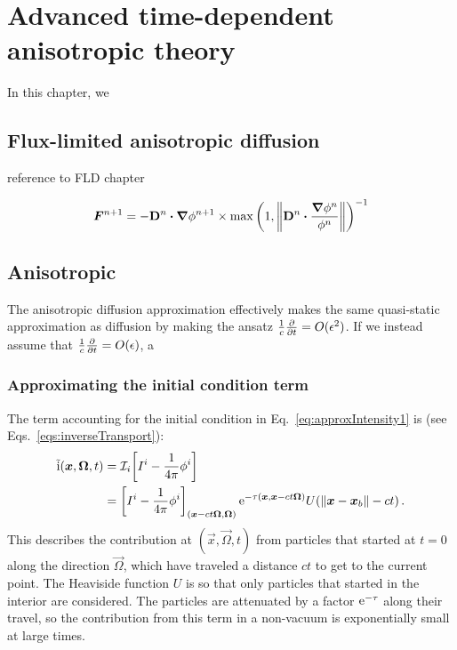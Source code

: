 
\chapter{Advanced time-dependent anisotropic theory}\label{chap:aponeDerivation}

In this chapter, we 

\section{Flux-limited anisotropic diffusion}


reference to FLD chapter

\begin{equation*}
  \bm{F}^{n+1} = -\mathbf{D}^{n}\bm{\cdot} \bm{\nabla} \phi^{n+1} \times 
  \max\left( 1, \left\| \mathbf{D}^{n}\bm{\cdot} \frac{\bm{\nabla} \phi^{n}}{\phi^{n}} \right\|
  \right)^{-1}
\end{equation*}


\section{Anisotropic \Pone}
The anisotropic diffusion approximation effectively makes the same quasi-static
approximation as diffusion by making the ansatz
$\frac1c\frac{\partial }{\partial t}=O(\epsilon^2)$. If we instead assume that
$\frac1c\frac{\partial }{\partial t}=O(\epsilon)$, a 

\subsection{Approximating the initial condition term}\label{sec:derPoneIc}
The term accounting for the initial condition in
Eq.~\eqref{eq:approxIntensity1} is (see Eqs.~\eqref{eqs:inverseTransport}):
\begin{align*}
  \mathrm{ \tilde i }(\bm{x}, \bm{\Omega}, t) &=
    \mathcal{I}_{i}\!\left[I^i - \frac1{4\pi} \phi^i\right]
  \\
  &= \left[ I^i - \frac1{4\pi} \phi^i \right]_{( \bm{x} - ct
  \bm{\Omega}, \bm{\Omega})}
    \mathop{}\!\mathrm{e}^{ -\tau(\bm{x}, \bm{x} - ct \bm{\Omega})}
    U( \left\| \bm{x} - \bm{x}_b \right\| - ct)\,.
\end{align*}
This describes the contribution at $(\vec{x}, \vec{\Omega}, t)$ from particles
that started at $t=0$ along the direction $\vec{\Omega}$, which have
traveled a distance $ct$ to get to the current point. The Heaviside function
$U$ is so that only particles that started in the interior are considered. The
particles are attenuated by a factor $\mathop{}\!\mathrm{e}^{ -\tau}$ along their travel, so
the contribution from this term in a non-vacuum is exponentially small at large
times.

